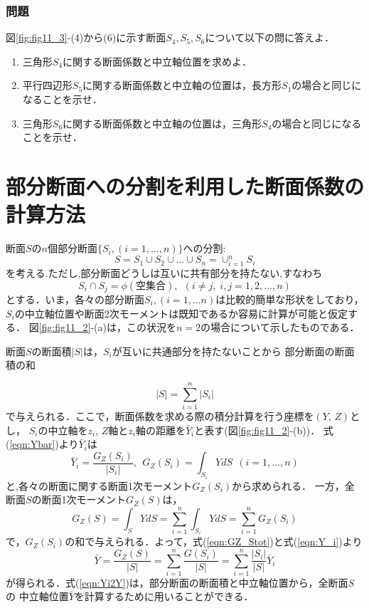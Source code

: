 ﻿\documentclass[10pt,a4j]{jbook}
\begin{document}
\subsubsection{問題}
図\ref{fig:fig11_3}-(4)から(6)に示す断面$S_4,S_5,S_6$について以下の問に答えよ．
\begin{enumerate}
\item
三角形$S_4$に関する断面係数と中立軸位置を求めよ．
\item
平行四辺形$S_5$に関する断面係数と中立軸の位置は，長方形$S_1$の場合と同じになることを示せ．
\item
三角形$S_6$に関する断面係数と中立軸の位置は，三角形$S_4$の場合と同じになることを示せ．
\end{enumerate}
\section{部分断面への分割を利用した断面係数の計算方法}
断面$S$の$n$個部分断面$\{ S_i, (i=1,\dots, n)\}$への分割:
\begin{equation}
	S=S_1\cup S_2 \cup \dots \cup S_n=\cup_{i=1}^n S_i
	\label{eqn:cup_Si}
\end{equation}
を考える.ただし,部分断面どうしは互いに共有部分を持たない,すなわち
\begin{equation}
	S_i \cap S_j =\phi(空集合), \ \ (i\neq j,\; i,j=1,2,\dots ,n ) 
	\label{eqn:cap_Si}
\end{equation}
とする．いま，各々の部分断面$S_i,(i=1,\dots n)$は比較的簡単な形状をしており，
$S_i$の中立軸位置や断面2次モーメントは既知であるか容易に計算が可能と仮定する．
図\ref{fig:fig11_2}-(a)は，この状況を$n=2$の場合について示したものである．


断面$S$の断面積$\left| S \right|$は，$S_i$が互いに共通部分を持たないことから
部分断面の断面積の和

\begin{equation}
	\left|S\right| = \sum_{i=1}^n \left| S_i \right|
	\label{eqn:Stot}
\end{equation}
で与えられる．ここで，断面係数を求める際の積分計算を行う座標を$(Y,\,Z)$とし，
$S_i$の中立軸を$z_i$, $Z$軸と$z_i$軸の距離を$\bar Y_i$と表す(図\ref{fig:fig11_2}-(b))．
式(\ref{eqn:Ybar})より$\bar Y_i$は
\begin{equation}
	\bar{Y}_i = \frac{G_Z(S_i)}{\left| S_i \right|}, 
	\ \ G_Z(S_i)=\int_{S_i}YdS
\ \ (i=1,\dots,n)
	\label{eqn:Y_i}
\end{equation}
と,各々の断面に関する断面1次モーメント$G_Z(S_i)$から求められる．
一方，全断面$S$の断面1次モーメント$G_Z(S)$は，
\begin{equation}
	G_Z(S)=\int_SYdS
	=\sum_{i=1}^n \int_{S_i} YdS
	=\sum_{i=1}^n G_Z(S_i)
	\label{eqn:GZ_Stot}
\end{equation}
で，$G_Z(S_i)$の和で与えられる．よって，式(\ref{eqn:GZ_Stot})と式(\ref{eqn:Y_i})より
\begin{equation}
	\bar Y 
	= \frac{G_Z(S)}{\left| S \right|}
	= \sum_{i=1}^n \frac{G(S_i)}{\left| S \right|}
	= \sum_{i=1}^n \frac{\left| S_i\right|}{\left| S \right|}\bar{Y}_i
	\label{eqn:Yi2Y}
\end{equation}
が得られる．式(\ref{eqn:Yi2Y})は，部分断面の断面積と中立軸位置から，全断面$S$の
中立軸位置$\bar Y$を計算するために用いることができる．
\end{document}
